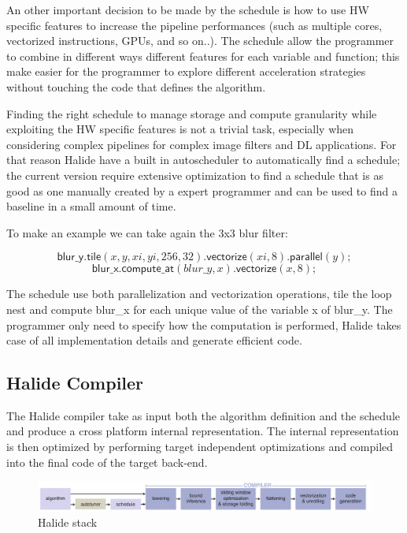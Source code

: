 \documentclass[../main.tex]{subfiles}
\begin{document}
An other important decision to be made by the schedule is how to use HW specific features to increase the pipeline performances (such as multiple cores, vectorized instructions, GPUs, and so on..). The schedule allow the programmer to combine in different ways different features for each variable and function; this make easier for the programmer to explore different acceleration strategies without touching the code that defines the algorithm.

Finding the right schedule to manage storage and compute granularity while exploiting the HW specific features is not a trivial task, especially when considering complex pipelines for complex image filters and DL applications. For that reason Halide have a built in autoscheduler \cite{halideAutoscheduler} to automatically find a schedule; the current version require extensive optimization to find a schedule that is as good as one manually created by a expert programmer and can be used to find a baseline in a small amount of time.

To make an example we can take again the 3x3 blur filter:

\[ \mathsf{blur\_y.tile}(x, y, xi, yi, 256, 32)\mathsf{.vectorize}(xi, 8)\mathsf{.parallel}(y);\]
\[ \mathsf{blur\_x.compute\_at}(blur\_y, x)\mathsf{.vectorize}(x, 8);\]

The schedule use both parallelization and vectorization operations, tile the loop nest and compute blur\_x for each unique value of the variable x of blur\_y. The programmer only need to specify how the computation is performed, Halide takes case of all implementation details and generate efficient code.

\subsection{Halide Compiler}

The Halide compiler \cite{halide1} take as input both the algorithm definition and the schedule and produce a cross platform internal representation. The internal representation is then optimized by performing target independent optimizations and compiled into the final code of the target back-end.

\begin{figure}[h!]
  \includegraphics[width=1\textwidth]{images/HalideCompilerStack.png}
  \centering
  \caption{Halide stack \cite{halide1} }
  \label{fig:HalideStack}
\end{figure}
\end{document}
